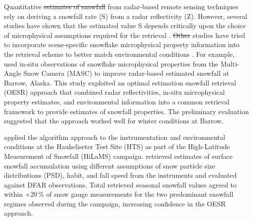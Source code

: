\documentclass{ametsocV5}
\providecommand{\DIFadd}[1]{{\protect\color{blue}\uwave{#1}}} %
\providecommand{\DIFdel}[1]{{\protect\color{red}\sout{#1}}}                      %
\providecommand{\DIFaddbegin}{} %
\providecommand{\DIFaddend}{} %
\providecommand{\DIFdelbegin}{} %
\providecommand{\DIFdelend}{} %
\newcommand{\DIFscaledelfig}{0.5}
\newlength{\DIFdelgraphicswidth} %
\newlength{\DIFdelgraphicsheight} %
\newcommand{\DIFaddincludegraphics}[2][]{{\color{blue}\fbox{\DIFOincludegraphics[#1]{#2}}}} %
\newcommand{\DIFdelincludegraphics}[2][]{%
\sbox{\DIFdelgraphicsbox}{\DIFOincludegraphics[#1]{#2}}%
\settoboxwidth{\DIFdelgraphicswidth}{\DIFdelgraphicsbox} %
\settoboxtotalheight{\DIFdelgraphicsheight}{\DIFdelgraphicsbox} %
\scalebox{\DIFscaledelfig}{%
\parbox[b]{\DIFdelgraphicswidth}{\usebox{\DIFdelgraphicsbox}\\[-\baselineskip] \rule{\DIFdelgraphicswidth}{0em}}\llap{\resizebox{\DIFdelgraphicswidth}{\DIFdelgraphicsheight}{%
\setlength{\unitlength}{\DIFdelgraphicswidth}%
\begin{picture}(1,1)%
\thicklines\linethickness{2pt} %
{\color[rgb]{1,0,0}\put(0,0){\framebox(1,1){}}}%
{\color[rgb]{1,0,0}\put(0,0){\line( 1,1){1}}}%
{\color[rgb]{1,0,0}\put(0,1){\line(1,-1){1}}}%
\end{picture}%
}\hspace*{3pt}}} %
} %
\DeclareRobustCommand{\DIFaddbegin}{\DIFOaddbegin \let\includegraphics\DIFaddincludegraphics} %
\DeclareRobustCommand{\DIFaddend}{\DIFOaddend \let\includegraphics\DIFOincludegraphics} %
\DeclareRobustCommand{\DIFdelbegin}{\DIFOdelbegin \let\includegraphics\DIFdelincludegraphics} %
\DeclareRobustCommand{\DIFdelend}{\DIFOaddend \let\includegraphics\DIFOincludegraphics} %
\begin{document}
    Quantitative \DIFdelbegin \DIFdel{estimates of snowfall }\DIFdelend \DIFaddbegin \DIFadd{snowfall estimates }\DIFaddend from radar-based remote sensing techniques rely on deriving a snowfall rate (S) from a radar reflectivity (Z). However, several studies have shown that the estimated value S depends critically upon the choice of microphysical assumptions required for the retrieval \citep{kulie_utilizing_2009,friedrich_quantifying_2020}. \DIFdelbegin \DIFdel{Other }\DIFdelend \DIFaddbegin \DIFadd{Therefore, other }\DIFaddend studies have tried to incorporate scene-specific snowflake microphysical property information into the retrieval scheme to better match environmental conditions \citep{wood_microphysical_2015}. For example, \citet{cooper_variational_2017} used in-situ observations of snowflake microphysical properties from the Multi-Angle Snow Camera (MASC) to improve radar-based estimated snowfall at Barrow, Alaska. This study exploited an optimal estimation snowfall retrieval (OESR) approach that combined radar reflectivities, in-situ microphysical property estimates, and environmental information into a common retrieval framework to provide estimates of snowfall properties. The preliminary evaluation suggested that the approach worked well for winter conditions at Barrow.

    \citet{schirle_estimation_2019} applied the \citet{cooper_variational_2017} algorithm approach to the instrumentation and environmental conditions at the Haukeliseter Test Site (HTS) as part of the High-Latitude Measurement of Snowfall (HiLaMS) campaign. \citet{schirle_estimation_2019} retrieved estimates of surface
	snowfall accumulation using different assumptions of snow particle size distributions (PSD), habit, and fall speed from the instruments and evaluated \DIFaddbegin \DIFadd{them }\DIFaddend against DFAR observations. Total retrieved seasonal snowfall values agreed to within +20\,\% of snow gauge measurements for the two predominant snowfall regimes observed during the campaign, increasing confidence in the OESR approach. 
\end{document}
